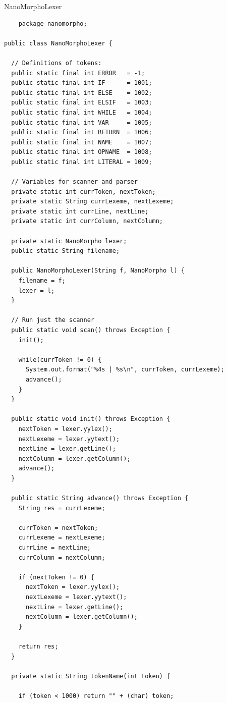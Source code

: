 \documentclass{homework}
\begin{document}
\newpage
\begin{question}{NanoMorphoLexer}
\end{question}
\begin{answer}
  \begin{verbatim}
    package nanomorpho;

public class NanoMorphoLexer {

  // Definitions of tokens:
  public static final int ERROR   = -1;
  public static final int IF      = 1001;
  public static final int ELSE    = 1002;
  public static final int ELSIF   = 1003;
  public static final int WHILE   = 1004;
  public static final int VAR     = 1005;
  public static final int RETURN  = 1006;
  public static final int NAME    = 1007;
  public static final int OPNAME  = 1008;
  public static final int LITERAL = 1009;

  // Variables for scanner and parser
  private static int currToken, nextToken;
  private static String currLexeme, nextLexeme;
  private static int currLine, nextLine;
  private static int currColumn, nextColumn;

  private static NanoMorpho lexer;
  public static String filename;

  public NanoMorphoLexer(String f, NanoMorpho l) {
    filename = f;
    lexer = l;
  }

  // Run just the scanner
  public static void scan() throws Exception {
    init();

    while(currToken != 0) {
      System.out.format("%4s | %s\n", currToken, currLexeme);
      advance();
    }
  }

  public static void init() throws Exception {
    nextToken = lexer.yylex();
    nextLexeme = lexer.yytext();
    nextLine = lexer.getLine();
    nextColumn = lexer.getColumn();
    advance();
  }

  public static String advance() throws Exception {
    String res = currLexeme;

    currToken = nextToken;
    currLexeme = nextLexeme;
    currLine = nextLine;
    currColumn = nextColumn;

    if (nextToken != 0) {
      nextToken = lexer.yylex();
      nextLexeme = lexer.yytext();
      nextLine = lexer.getLine();
      nextColumn = lexer.getColumn();
    }

    return res;
  }

  private static String tokenName(int token) {

    if (token < 1000) return "" + (char) token;


\end{verbatim}
\end{answer}
\end{document}
